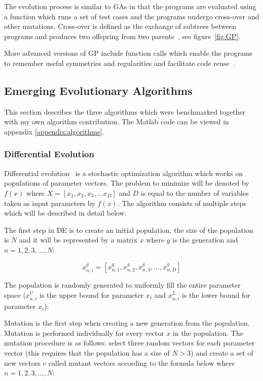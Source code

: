 The evolution process is similar to GAs in that the programs are evaluated using a function which runs a set of test cases and the programs undergo cross-over and other mutations. Cross-over is defined as the exchange of subtrees between programs and produces two offspring from two parents~\cite{Michalewicz1997}, see figure~\ref{fig:GP}.

More advanced versions of GP include function calls which enable the programs to remember useful symmetries and regularities and facilitate code reuse~\cite{Michalewicz1997}.

\subsection{Emerging Evolutionary Algorithms}

This section describes the three algorithms which were benchmarked together with my own algorithm contribution. The Matlab code can be viewed in appendix \ref{appendix:algorithms}.

\subsubsection{Differential Evolution}

Differential evolution~\cite{Storn1997} is a stochastic optimization algorithm which works on populations of parameter vectors. The problem to minimize will be denoted by $f(x)$ where $X=[x_1,x_2,x_3,...x_D]$ and $D$ is equal to the number of variables taken as input parameters by $f(x)$. The algorithm consists of multiple steps which will be described in detail below.

The first step in DE is to create an initial population, the size of the population is $N$ and it will be represented by a matrix $x$ where $g$ is the generation and $n=1,2,3,...,N$:

\begin{equation}
x_{n,i}^{g} = [ x_{n,1}^{g}, x_{n,2}^{g}, x_{n,3}^{g}, ..., x_{n,D}^{g} ]
\end{equation}

The population is randomly generated to uniformly fill the entire parameter space ($x_{n,i}^U$ is the upper bound for parameter $x_i$ and $x_{n,i}^L$ is the lower bound for parameter $x_i$):

Mutation is the first step when creating a new generation from the population. Mutation is performed individually for every vector $x$ in the population. The mutation procedure is as follows: select three random vectors for each parameter vector (this requires that the population has a size of $N > 3$) and create a set of new vectors $v$ called mutant vectors according to the formula below where $n=1,2,3,...,N$:


